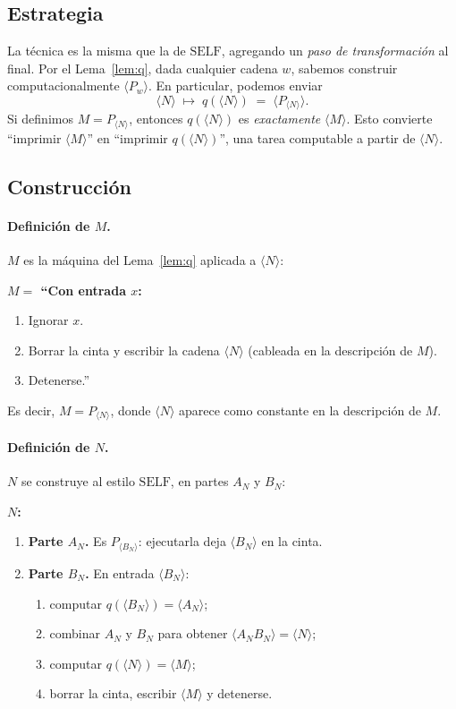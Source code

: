 \documentclass[11pt,a4paper]{article}
\theoremstyle{plain}
\theoremstyle{definition}
\theoremstyle{remark}
\newcommand{\enc}[1]{\langle #1\rangle}
\newcommand{\SELF}{\mathrm{SELF}}
\newcommand{\Pw}[1]{P_{#1}}
\begin{document}
\subsection*{Estrategia}

La t\'ecnica es la misma que la de $\SELF$, agregando un \emph{paso de
transformaci\'on} al final. Por el Lema~\ref{lem:q}, dada cualquier cadena
$w$, sabemos construir computacionalmente $\enc{\Pw{w}}$. En particular,
podemos enviar
\[
  \enc{N} \;\longmapsto\; q(\enc{N}) \;=\; \enc{\Pw{\enc{N}}}.
\]
Si definimos $M = \Pw{\enc{N}}$, entonces $q(\enc{N})$ es \emph{exactamente}
$\enc{M}$. Esto convierte ``imprimir $\enc{M}$'' en ``imprimir $q(\enc{N})$'',
una tarea computable a partir de $\enc{N}$.

\subsection*{Construcci\'on}

\paragraph{Definici\'on de $M$.}
$M$ es la m\'aquina del Lema~\ref{lem:q} aplicada a $\enc{N}$:

\medskip\noindent\textbf{$M = $ ``Con entrada $x$:}
\begin{enumerate}
  \item Ignorar $x$.
  \item Borrar la cinta y escribir la cadena $\enc{N}$ (cableada en la
        descripci\'on de $M$).
  \item Detenerse.''
\end{enumerate}
\medskip

Es decir, $M=\Pw{\enc{N}}$, donde $\enc{N}$ aparece como constante en la
descripci\'on de $M$.

\paragraph{Definici\'on de $N$.}
$N$ se construye al estilo $\SELF$, en partes $A_N$ y $B_N$:

\medskip\noindent\textbf{$N$:}
\begin{enumerate}
  \item \textbf{Parte $A_N$.} Es $\Pw{\enc{B_N}}$: ejecutarla deja $\enc{B_N}$
        en la cinta.
  \item \textbf{Parte $B_N$.} En entrada $\enc{B_N}$:
        \begin{enumerate}
          \item computar $q(\enc{B_N}) = \enc{A_N}$;
          \item combinar $A_N$ y $B_N$ para obtener $\enc{A_N B_N}=\enc{N}$;
          \item computar $q(\enc{N})=\enc{M}$;
          \item borrar la cinta, escribir $\enc{M}$ y detenerse.
        \end{enumerate}
\end{enumerate}
\medskip
\end{document}
